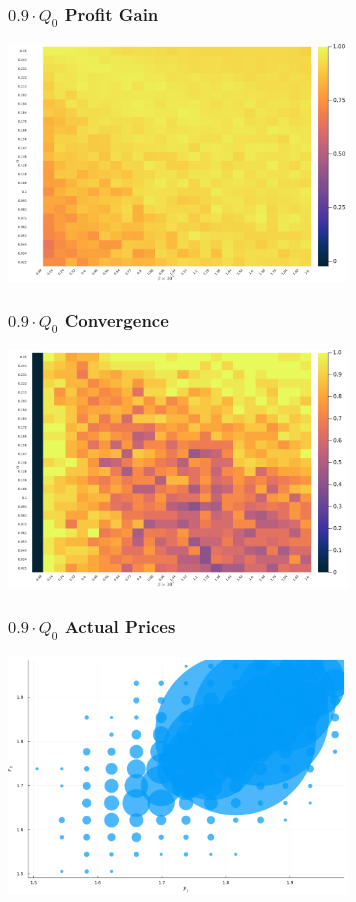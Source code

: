 \documentclass{beamer}
\begin{document}
	\begin{frame}\frametitle{$0.9 \cdot Q_0$ Profit Gain}
\begin{center}
	\includegraphics[width=9cm]{heatmap_profit_gain_small_0.9.png}
\end{center}
\end{frame}
\begin{frame}\frametitle{$0.9 \cdot Q_0$ Convergence}
\begin{center}
	\includegraphics[width=9cm]{heatmap_convergence_counts_small_0.9.png}
\end{center}
\end{frame}
\begin{frame}\frametitle{$0.9 \cdot Q_0$ Actual Prices}
\begin{center}
	\includegraphics[width=9cm]{scatter_plot_prices_small_0.9.png}
\end{center}
\end{frame}
\end{document}
